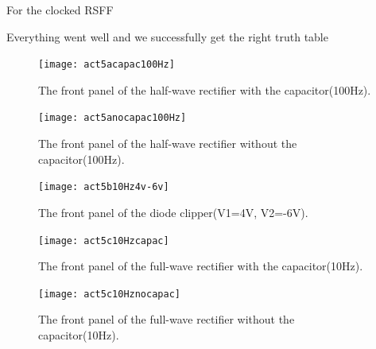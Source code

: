 \documentclass[11pt]{article}
\begin{document}
For the clocked RSFF

Everything went well and we successfully get the right truth table

\begin{figure}[H]
 \begin{center}
  \texttt{[image: act5acapac100Hz]}
  \caption{The front panel of the half-wave rectifier with the capacitor(100Hz).}
  \label{fig:act5acapac100Hz}
 \end{center}
\end{figure}

\begin{figure}[H]
 \begin{center}
  \texttt{[image: act5anocapac100Hz]}
  \caption{The front panel of the half-wave rectifier without the capacitor(100Hz).}
  \label{fig:act5anocapac100Hz}
 \end{center}
\end{figure}

\begin{figure}[H]
 \begin{center}
  \texttt{[image: act5b10Hz4v-6v]}
  \caption{The front panel of the diode clipper(V1=4V, V2=-6V).}
  \label{fig:act5b10Hz4v-6v}
 \end{center}
\end{figure}

\begin{figure}[H]
 \begin{center}
  \texttt{[image: act5c10Hzcapac]}
  \caption{The front panel of the full-wave rectifier with the capacitor(10Hz).}
  \label{fig:act5c10Hzcapac}
 \end{center}
\end{figure}

\begin{figure}[H]
 \begin{center}
  \texttt{[image: act5c10Hznocapac]}
  \caption{The front panel of the full-wave rectifier without the capacitor(10Hz).}
  \label{fig:act5c10Hznocapac}
 \end{center}
\end{figure}
\end{document}
